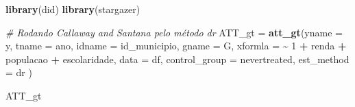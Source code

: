 \documentclass[portugues]{article}
\newenvironment{Shaded}{\begin{snugshade}}{\end{snugshade}}
\newcommand{\AttributeTok}[1]{\textcolor[rgb]{0.13,0.29,0.53}{#1}}
\newcommand{\CommentTok}[1]{\textcolor[rgb]{0.56,0.35,0.01}{\textit{#1}}}
\newcommand{\DecValTok}[1]{\textcolor[rgb]{0.00,0.00,0.81}{#1}}
\newcommand{\FunctionTok}[1]{\textcolor[rgb]{0.13,0.29,0.53}{\textbf{#1}}}
\newcommand{\NormalTok}[1]{#1}
\newcommand{\OtherTok}[1]{\textcolor[rgb]{0.56,0.35,0.01}{#1}}
\newcommand{\SpecialCharTok}[1]{\textcolor[rgb]{0.81,0.36,0.00}{\textbf{#1}}}
\newcommand{\StringTok}[1]{\textcolor[rgb]{0.31,0.60,0.02}{#1}}
\begin{document}
\begin{box_code}

\begin{Shaded}
\begin{Highlighting}[]
\FunctionTok{library}\NormalTok{(did)}
\FunctionTok{library}\NormalTok{(stargazer)}

\CommentTok{\# Rodando Callaway and Sant\textquotesingle{}ana pelo método \textquotesingle{}dr\textquotesingle{}}
\NormalTok{ATT\_gt }\OtherTok{=} \FunctionTok{att\_gt}\NormalTok{(}\AttributeTok{yname =} \StringTok{\textquotesingle{}y\textquotesingle{}}\NormalTok{, }
                \AttributeTok{tname =} \StringTok{\textquotesingle{}ano\textquotesingle{}}\NormalTok{, }
                \AttributeTok{idname =} \StringTok{\textquotesingle{}id\_municipio\textquotesingle{}}\NormalTok{, }
                \AttributeTok{gname =} \StringTok{\textquotesingle{}G\textquotesingle{}}\NormalTok{, }
                \AttributeTok{xformla =} \SpecialCharTok{\textasciitilde{}} \DecValTok{1} \SpecialCharTok{+}\NormalTok{ renda }\SpecialCharTok{+}\NormalTok{ populacao }
                \hspace{10mm}\SpecialCharTok{+}\NormalTok{ escolaridade,}
                \AttributeTok{data =}\NormalTok{ df, }
                \AttributeTok{control\_group =} \StringTok{\textquotesingle{}nevertreated\textquotesingle{}}\NormalTok{, }
                \AttributeTok{est\_method =} \StringTok{\textquotesingle{}dr\textquotesingle{}}
\NormalTok{                )}

\NormalTok{ATT\_gt}
\end{Highlighting}
\end{Shaded}


\end{box_code}
\end{document}
